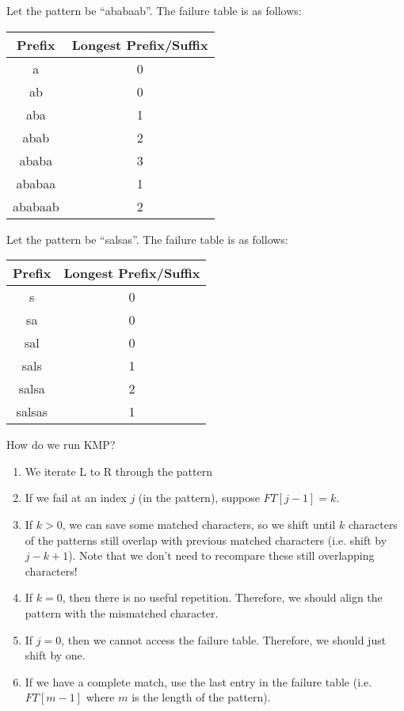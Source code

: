 \begin{eg}
	Let the pattern be ``ababaab''. The failure table is as follows:
	\begin{center}
		\begin{tabular}{|c|c|}
			\hline
			\textbf{Prefix} & \textbf{Longest Prefix/Suffix} \\
			\hline
			a & 0 \\
			ab & 0 \\
			aba & 1 \\
			abab & 2 \\
			ababa & 3 \\
			ababaa & 1 \\
			ababaab & 2 \\
			\hline
		\end{tabular}
	\end{center}
\end{eg}

\begin{eg}
	Let the pattern be ``salsas''. The failure table is as follows:
	\begin{center}
		\begin{tabular}{|c|c|}
			\hline
			\textbf{Prefix} & \textbf{Longest Prefix/Suffix} \\
			\hline
			s & 0 \\
			sa & 0 \\
			sal & 0 \\
			sals & 1 \\
			salsa & 2 \\
			salsas & 1 \\
			\hline
		\end{tabular}
	\end{center}
\end{eg}

How do we run KMP?
\begin{enumerate}
	\item We iterate L to R through the pattern
	\item If we fail at an index \( j \) (in the pattern), suppose \( FT[j-1]=k \).
	\item If \( k > 0  \), we can save some matched characters, so we shift until \( k \) characters of the patterns still overlap with previous matched characters (i.e. shift by \( j - k + 1 \)). Note that we don't need to recompare these still overlapping characters!
	\item If \( k=0 \), then there is no useful repetition. Therefore, we should align the pattern with the mismatched character.
	\item If \( j=0 \), then we cannot access the failure table. Therefore, we should just shift by one.
	\item If we have a complete match, use the last entry in the failure table (i.e. \( FT[m-1] \) where \( m \) is the length of the pattern).
\end{enumerate}

